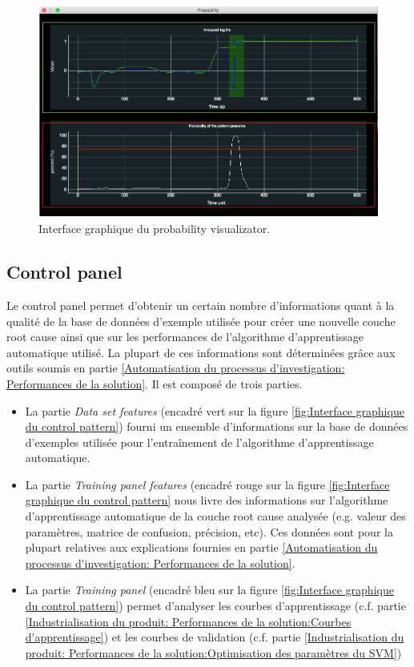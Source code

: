 \begin{figure}[h]
	\centering\includegraphics[height=7cm]{images/proba_visu.png}
	\caption[Interface graphique du probability visualizator]{Interface graphique du probability visualizator.}
	\label{fig:Interface graphique du probability visualizator}
\end{figure}

\subsection{Control panel}
\label{Industrialisation du produit: Outils graphiques: Control panel}
Le control panel permet d'obtenir un certain nombre d'informations quant à la qualité de la base de données d'exemple utilisée pour créer une nouvelle couche root cause ainsi que sur les performances de l'algorithme d'apprentissage automatique utilisé. La plupart de ces informations sont déterminées grâce aux outils soumis en partie \ref{Automatisation du processus d'investigation: Performances de la solution}. Il est composé de trois parties.
\begin{itemize}
	\item La partie \emph{Data set features} (encadré vert sur la figure \ref{fig:Interface graphique du control pattern}) fourni un ensemble d'informations sur la base de données d'exemples utilisée pour l'entraînement de l'algorithme d'apprentissage automatique. 
	\item La partie \emph{Training panel features} (encadré rouge sur la figure \ref{fig:Interface graphique du control pattern} nous livre des informations sur  l'algorithme d'apprentissage automatique de la couche root cause analysée (e.g. valeur des paramètres, matrice de confusion, précision, etc). Ces données sont pour la plupart relatives aux explications fournies en partie \ref{Automatisation du processus d'investigation: Performances de la solution}.
	\item La partie \emph{Training panel} (encadré bleu sur la figure \ref{fig:Interface graphique du control pattern}) permet d'analyser les courbes d'apprentissage (c.f. partie \ref{Industrialisation du produit: Performances de la solution:Courbes d'apprentissage}) et les courbes de validation (c.f. partie \ref{Industrialisation du produit: Performances de la solution:Optimisation des paramètres du SVM})
\end{itemize}

